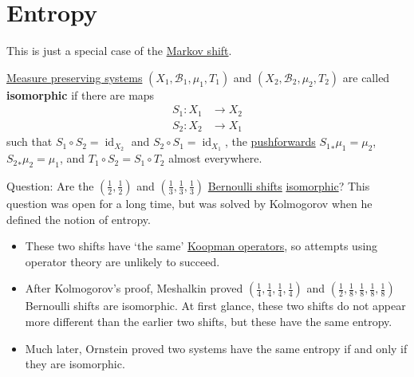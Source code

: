 \documentclass{article}
\newcommand{\named}[1]{\textbf{#1}\index{#1}}
\begin{document}
\section{Entropy}
This is just a special case of the \hyperlink{def:markovshift}{Markov shift}.
\begin{defi}
  \hyperlink{def:mps}{Measure preserving systems} $(X_1, \mathcal{B}_1, \mu_1, T_1)$ and $(X_2, \mathcal{B}_2, \mu_2, T_2)$ are called \named{isomorphic} if there are maps
  \begin{align*}
    S_1: X_1 &\longrightarrow X_2 \\
    S_2: X_2 &\longrightarrow X_1
  \end{align*}
  such that $S_1 \circ S_2 = \operatorname{id}_{X_2}$ and $S_2 \circ S_1 = \operatorname{id}_{X_1}$, the \hyperlink{def:pushforward}{pushforwards} ${S_1}_* \mu_1 = \mu_2$, ${S_2}_* \mu_2 = \mu_1$, and $T_1 \circ S_2 = S_1 \circ T_2$ almost everywhere.
\end{defi}

Question: Are the $(\frac{1}{2}, \frac{1}{2})$ and $(\frac{1}{3}, \frac{1}{3}, \frac{1}{3})$ \hyperlink{def:bernoullishift}{Bernoulli shifts} \hyperlink{def:iso}{isomorphic}?
This question was open for a long time, but was solved by Kolmogorov when he defined the notion of entropy.

\begin{itemize}
  \item These two shifts have `the same' \hyperlink{def:koopman}{Koopman operators}, so attempts using operator theory are unlikely to succeed.
  \item After Kolmogorov's proof, Meshalkin proved $(\frac{1}{4}, \frac14, \frac14, \frac14)$ and $(\frac12, \frac18,\frac18,\frac18,\frac18)$ Bernoulli shifts are isomorphic.
    At first glance, these two shifts do not appear more different than the earlier two shifts, but these have the same entropy.
  \item Much later, Ornstein proved two systems have the same entropy if and only if they are isomorphic.
\end{itemize}
\end{document}
